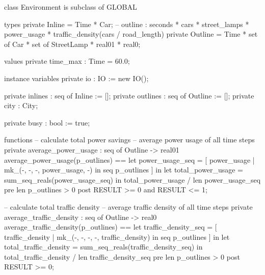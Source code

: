 \documentclass[a4paper]{article}
\begin{document}
\title{}
\author{}
\begin{vdm_al}
class Environment is subclass of GLOBAL

types
    private Inline = Time * Car;
    -- outline : seconds * cars * street_lamps * power_usage * traffic_density(cars / road_length)
    private Outline = Time * set of Car * set of StreetLamp * real01 * real0;

values
    private time_max : Time = 60.0;

instance variables
    private io : IO := new IO();

    private inlines : seq of Inline := [];
    private outlines : seq of Outline := [];
    private city : City;
    
    private busy : bool := true;

functions
    -- calculate total power savings
    -- average power usage of all time steps
    private average_power_usage : seq of Outline -> real01
    average_power_usage(p_outlines) ==
        let power_usage_seq = [
            power_usage
            | mk_(-, -, -, power_usage, -) in seq p_outlines
        ] in
            let total_power_usage = sum_seq_reals(power_usage_seq) in
                total_power_usage / len power_usage_seq
    pre len p_outlines > 0
    post RESULT >= 0 and RESULT <= 1;

    -- calculate total traffic density
    -- average traffic density of all time steps
    private average_traffic_density : seq of Outline -> real0
    average_traffic_density(p_outlines) ==
        let traffic_density_seq = [
            traffic_density
            | mk_(-, -, -, -, traffic_density) in seq p_outlines
        ] in
            let total_traffic_density = sum_seq_reals(traffic_density_seq) in
                total_traffic_density / len traffic_density_seq
    pre len p_outlines > 0
    post RESULT >= 0;


\end{vdm_al}
\end{document}
